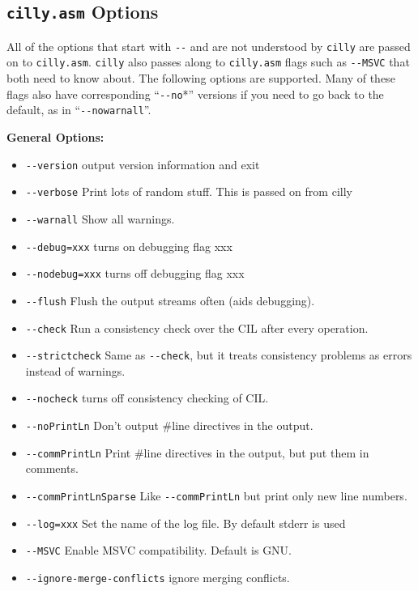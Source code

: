 \documentclass{article}
\def\t#1{{\tt #1}}
\begin{document}
 
  \subsection{\t{cilly.asm} Options}
  \label{sec-cilly-asm-options}

 All of the options that start with \t{-{}-} and are not understood by
\t{cilly} are passed on to \t{cilly.asm}.   \t{cilly} also passes along to
\t{cilly.asm} flags such as \t{-{}-MSVC} that both need to know
about.  The following options are supported.  Many of these flags also
have corresponding ``\t{-{}-no}*'' versions if you need to go back to
the default, as in ``\t{-{}-nowarnall}''.

\hspace*{2cm} {\bf General Options:}
\begin{itemize}
  \item \t{-{}-version} output version information and exit
  \item \t{-{}-verbose} Print lots of random stuff. This is passed on from cilly
  \item \t{-{}-warnall} Show all warnings.
  \item \t{-{}-debug=xxx} turns on debugging flag xxx
  \item \t{-{}-nodebug=xxx} turns off debugging flag xxx
  \item \t{-{}-flush} Flush the output streams often (aids debugging).
  \item \t{-{}-check} Run a consistency check over the CIL after every operation.
  \item \t{-{}-strictcheck} Same as \t{-{}-check}, but it treats
    consistency problems as errors instead of warnings.
  \item \t{-{}-nocheck} turns off consistency checking of CIL.
  \item \t{-{}-noPrintLn} Don't output \#line directives in the output.
  \item \t{-{}-commPrintLn} Print \#line directives in the output, but
    put them in comments.
  \item \t{-{}-commPrintLnSparse} Like \t{-{}-commPrintLn} but print only new
         line numbers.
  \item \t{-{}-log=xxx} Set the name of the log file.  By default stderr is used
  \item \t{-{}-MSVC} Enable MSVC compatibility. Default is GNU.
  \item \t{-{}-ignore-merge-conflicts} ignore merging conflicts.

\end{itemize}
\end{document}
